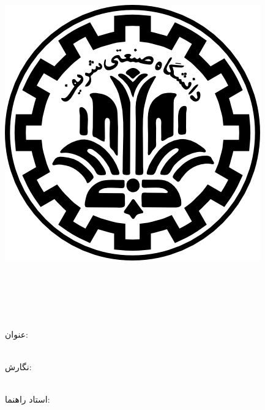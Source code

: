 


\begin{center}

\vspace{0.2cm}

\includegraphics[scale=0.2]{./base/figures/logo.png}

\begin{Large}

\vspace{-0.2cm}
\MyUniversityFarsi\\
\vspace{-0.1cm}
\MyDepartmentFarsi\\
\vspace{0.5cm}
\MyThesisFarsi\\
\vspace{-0.1cm}
\MyMajorFarsi\\

\end{Large}

\vspace{1cm}

\large{عنوان:}\\
\vspace{0.2cm}
\textbf{\huge{\MyThesisTitleFarsi}}\\

\vspace{0.7cm}

\large{نگارش:}\\
\Large{\textbf{\MyNameFarsi}}\\

\vspace{0.7cm}

\large{استاد راهنما:}\\ 
\Large{\textbf{\MyProfessorFarsi}}\\

\vspace{0.8cm}

\end{center}
